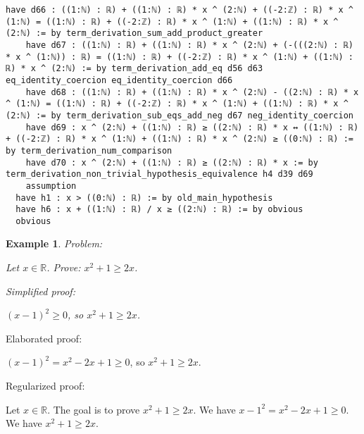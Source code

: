 \documentclass{article}
\newtheorem{example}{Example}
\begin{document}
\begin{tcolorbox}[colback=white!10, width=\linewidth]
\begin{lstlisting}[language=Lean4]
    have d66 : ((1:ℕ) : ℝ) + ((1:ℕ) : ℝ) * x ^ (2:ℕ) + ((-2:ℤ) : ℝ) * x ^ (1:ℕ) = ((1:ℕ) : ℝ) + ((-2:ℤ) : ℝ) * x ^ (1:ℕ) + ((1:ℕ) : ℝ) * x ^ (2:ℕ) := by term_derivation_sum_add_product_greater
    have d67 : ((1:ℕ) : ℝ) + ((1:ℕ) : ℝ) * x ^ (2:ℕ) + (-(((2:ℕ) : ℝ) * x ^ (1:ℕ)) : ℝ) = ((1:ℕ) : ℝ) + ((-2:ℤ) : ℝ) * x ^ (1:ℕ) + ((1:ℕ) : ℝ) * x ^ (2:ℕ) := by term_derivation_add_eq d56 d63 eq_identity_coercion eq_identity_coercion d66
    have d68 : ((1:ℕ) : ℝ) + ((1:ℕ) : ℝ) * x ^ (2:ℕ) - ((2:ℕ) : ℝ) * x ^ (1:ℕ) = ((1:ℕ) : ℝ) + ((-2:ℤ) : ℝ) * x ^ (1:ℕ) + ((1:ℕ) : ℝ) * x ^ (2:ℕ) := by term_derivation_sub_eqs_add_neg d67 neg_identity_coercion
    have d69 : x ^ (2:ℕ) + ((1:ℕ) : ℝ) ≥ ((2:ℕ) : ℝ) * x ↔ ((1:ℕ) : ℝ) + ((-2:ℤ) : ℝ) * x ^ (1:ℕ) + ((1:ℕ) : ℝ) * x ^ (2:ℕ) ≥ ((0:ℕ) : ℝ) := by term_derivation_num_comparison
    have d70 : x ^ (2:ℕ) + ((1:ℕ) : ℝ) ≥ ((2:ℕ) : ℝ) * x := by term_derivation_non_trivial_hypothesis_equivalence h4 d39 d69
    assumption
  have h1 : x > ((0:ℕ) : ℝ) := by old_main_hypothesis
  have h6 : x + ((1:ℕ) : ℝ) / x ≥ ((2:ℕ) : ℝ) := by obvious
  obvious

\end{lstlisting}
\end{tcolorbox}


\begin{example}
Problem:
\begin{tcolorbox}[colback=yellow!10, width=\linewidth]
Let $x\in\mathbb{R}$. Prove: $x^2 + 1\ge 2x$.
\end{tcolorbox}

Simplified proof:
\begin{tcolorbox}[colback=blue!10, width=\linewidth]
$(x-1)^2 \ge 0$, so $x^2 + 1 \ge 2x$.
\end{tcolorbox}
\end{example}

Elaborated proof:
\begin{tcolorbox}[colback=green!10, width=\linewidth]
$(x-1)^2 = x^2 - 2x + 1 \ge 0$, so $x^2 + 1 \ge 2x$.
\end{tcolorbox}

Regularized proof:
\begin{tcolorbox}[colback=red!10, width=\linewidth]
Let $x\in\mathbb{R}$.
The goal is to prove $x^2 + 1 \ge 2x$.
We have ${{x-1}}^2 = x^2 - 2x + 1 \ge 0$.
We have $x^2 + 1 \ge 2x$.
\end{tcolorbox}
\end{document}
